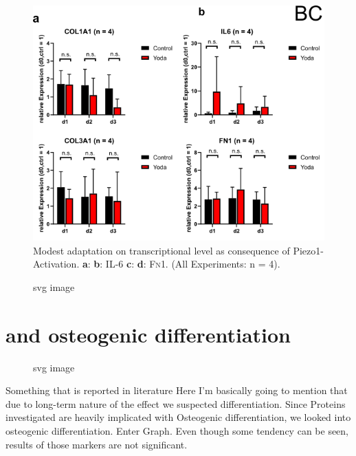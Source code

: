 \begin{figure}[ht]
    \centering
    \includegraphics[scale = 0.6]{Collection.png}
    \caption{
    Modest adaptation on transcriptional level as consequence of Piezo1-Activation. \hfill \newline
    \textbf{a}: \colone{}
    \textbf{b}: IL-6
    \textbf{c}: \colthree{}
    \textbf{d}: \textsc{Fn}1. 
    (All Experiments: n = 4). 
    }
    \label{fig:my_label}
\end{figure}


\begin{figure}[htbp]
  \centering
  
  \caption{svg image}
\end{figure}


\section{\Piezo and osteogenic differentiation}

\begin{figure}[htbp]
  \centering
  
  \caption{svg image}
\end{figure}

Something that is reported in literature Here I'm basically going to mention that due to long-term nature of the effect we suspected differentiation. Since Proteins investigated are heavily implicated with Osteogenic differentiation, we looked into osteogenic differentiation. Enter Graph. Even though some tendency can be seen, results of those markers are not significant. 


